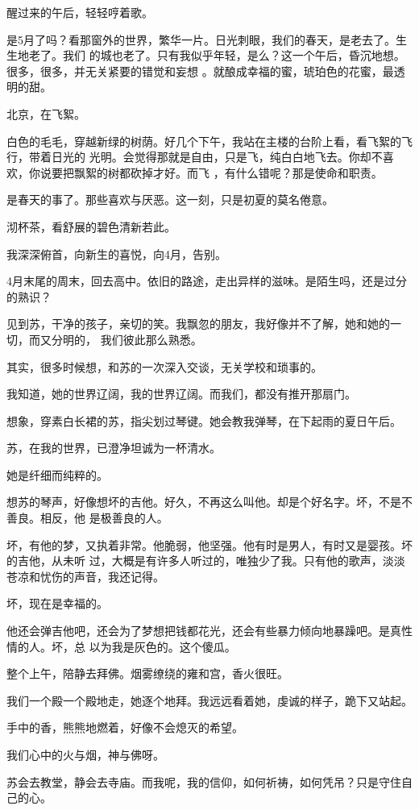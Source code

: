 \documentclass[12pt,a4paper]{article}
\begin{document}
		醒过来的午后，轻轻哼着歌。

		是5月了吗？看那窗外的世界，繁华一片。日光刺眼，我们的春天，是老去了。生生地老了。我们
	的城也老了。只有我似乎年轻，是么？这一个午后，昏沉地想。很多，很多，并无关紧要的错觉和妄想
	。就酿成幸福的蜜，琥珀色的花蜜，最透明的甜。

		北京，在飞絮。

		白色的毛毛，穿越新绿的树荫。好几个下午，我站在主楼的台阶上看，看飞絮的飞行，带着日光的
	光明。会觉得那就是自由，只是飞，纯白白地飞去。你却不喜欢，你说要把飘絮的树都砍掉才好。而飞
	，有什么错呢？那是使命和职责。

		是春天的事了。那些喜欢与厌恶。这一刻，只是初夏的莫名倦意。

		沏杯茶，看舒展的碧色清新若此。

		我深深俯首，向新生的喜悦，向4月，告别。

		4月末尾的周末，回去高中。依旧的路途，走出异样的滋味。是陌生吗，还是过分的熟识？

		见到苏，干净的孩子，亲切的笑。我飘忽的朋友，我好像并不了解，她和她的一切，而又分明的，
	我们彼此那么熟悉。

		其实，很多时候想，和苏的一次深入交谈，无关学校和琐事的。

		我知道，她的世界辽阔，我的世界辽阔。而我们，都没有推开那扇门。

		想象，穿素白长裙的苏，指尖划过琴键。她会教我弹琴，在下起雨的夏日午后。

		苏，在我的世界，已澄净坦诚为一杯清水。

		她是纤细而纯粹的。

		想苏的琴声，好像想坏的吉他。好久，不再这么叫他。却是个好名字。坏，不是不善良。相反，他
	是极善良的人。

		坏，有他的梦，又执着非常。他脆弱，他坚强。他有时是男人，有时又是婴孩。坏的吉他，从未听
	过，大概是有许多人听过的，唯独少了我。只有他的歌声，淡淡苍凉和忧伤的声音，我还记得。

		坏，现在是幸福的。

		他还会弹吉他吧，还会为了梦想把钱都花光，还会有些暴力倾向地暴躁吧。是真性情的人。坏，总
	以为我是灰色的。这个傻瓜。

		整个上午，陪静去拜佛。烟雾缭绕的雍和宫，香火很旺。

		我们一个殿一个殿地走，她逐个地拜。我远远看着她，虔诚的样子，跪下又站起。

		手中的香，熊熊地燃着，好像不会熄灭的希望。

		我们心中的火与烟，神与佛呀。

		苏会去教堂，静会去寺庙。而我呢，我的信仰，如何祈祷，如何凭吊？只是守住自己的心。
\end{document}
